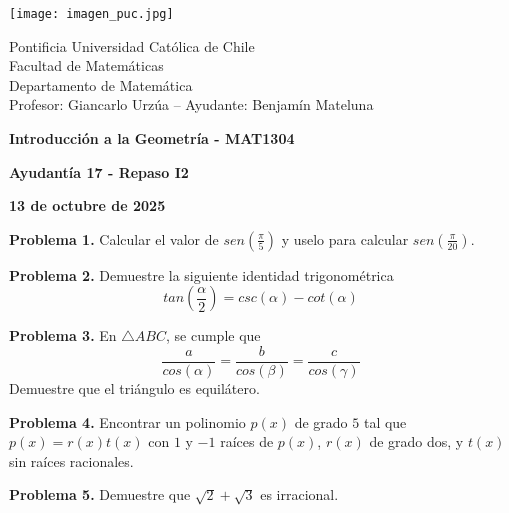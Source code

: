 \documentclass{article}
\begin{document}
\begin{minipage}{2.5cm}
    \texttt{[image: imagen\_puc.jpg]}
\end{minipage}
\begin{minipage}{14cm}
    {\sc Pontificia Universidad Católica de Chile\\
    Facultad de Matemáticas\\
    Departamento de Matemática\\
    Profesor: Giancarlo Urzúa -- Ayudante: Benjamín Mateluna}
\end{minipage}
\vspace{1ex}

{\centerline{\bf Introducción a la Geometría - MAT1304}
\centerline{\bf Ayudantía 17 - Repaso I2}}
\centerline{\bf 13 de octubre de 2025}

\vspace{1cm}

\vspace{5mm}
\noindent\textbf{Problema 1.} Calcular el valor de $sen(\frac{\pi}{5})$ y uselo para calcular 
$sen(\frac{\pi}{20})$.

\vspace{5mm}
\noindent\textbf{Problema 2.} Demuestre la siguiente identidad trigonométrica
\begin{equation*}
    tan\left(\frac{\alpha}{2}\right)=csc(\alpha)-cot(\alpha)
\end{equation*}

\vspace{5mm}
\noindent\textbf{Problema 3.} En $\triangle ABC$, se cumple que
\begin{equation*}
    \frac{a}{cos(\alpha)}=\frac{b}{cos(\beta)}=\frac{c}{cos(\gamma)}
\end{equation*}
Demuestre que el triángulo es equilátero.

\vspace{5mm}
\noindent\textbf{Problema 4.} Encontrar un polinomio $p(x)$ de grado $5$ tal que $p(x)=r(x)t(x)$
con $1$ y $-1$ raíces de $p(x)$, $r(x)$ de grado dos, y $t(x)$ sin raíces racionales.

\vspace{5mm}
\noindent\textbf{Problema 5.} Demuestre que $\sqrt{2}+\sqrt{3}$ es irracional.

\end{document}
